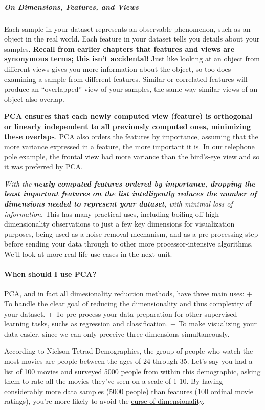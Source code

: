 \documentclass[11pt]{article}
\begin{document}
\hypertarget{on-dimensions-features-and-views}{%
\subparagraph{On Dimensions, Features, and
Views}\label{on-dimensions-features-and-views}}

Each sample in your dataset represents an observable phenomenon, such as
an object in the real world. Each feature in your dataset tells you
details about your samples. \textbf{Recall from earlier chapters that
features and views are synonymous terms; this isn't accidental!} Just
like looking at an object from different views gives you more
information about the object, so too does examining a sample from
different features. Similar or correlated features will produce an
``overlapped'' view of your samples, the same way similar views of an
object also overlap.

\textbf{PCA ensures that each newly computed view (feature) is
orthogonal or linearly independent to all previously computed ones,
minimizing these overlaps}. PCA also orders the features by importance,
assuming that the more variance expressed in a feature, the more
important it is. In our telephone pole example, the frontal view had
more variance than the bird's-eye view and so it was preferred by PCA.

\emph{With the \textbf{newly computed features ordered by importance,
dropping the least important features on the list intelligently reduces
the number of dimensions needed to represent your dataset}, with minimal
loss of information}. This has many practical uses, including boiling
off high dimensionality observations to just a few key dimensions for
visualization purposes, being used as a noise removal mechanism, and as
a pre-processing step before sending your data through to other more
processor-intensive algorithms. We'll look at more real life use cases
in the next unit.

\hypertarget{when-should-i-use-pca}{%
\paragraph{When should I use PCA?}\label{when-should-i-use-pca}}

PCA, and in fact all dimesionality reduction methods, have three main
uses: + To handle the clear goal of reducing the dimensionality and thus
complexity of your dataset. + To pre-process your data preparation for
other supervised learning tasks, suchs as regression and classification.
+ To make visualizing your data easier, since we can only preceive three
dimensions simultaneously.

According to Nielson Tetrad Demographics, the group of people who watch
the most movies are people between the ages of 24 through 35. Let's say
you had a list of 100 movies and surveyed 5000 people from within this
demographic, asking them to rate all the movies they've seen on a scale
of 1-10. By having considerably more data samples (5000 people) than
features (100 ordinal movie ratings), you're more likely to avoid the
\href{https://en.wikipedia.org/wiki/Curse_of_dimensionality}{curse of
dimensionality}.
\end{document}
